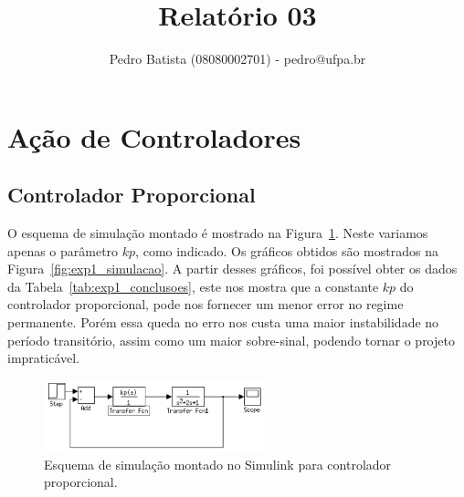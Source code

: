 \documentclass[a4paper]{article}
\title{Relatório 03}
\author{Pedro Batista (08080002701) - pedro@ufpa.br}
\begin{document}
\maketitle

\section{Ação de Controladores}

\subsection{Controlador Proporcional}
O esquema de simulação montado é mostrado na Figura~\ref{fig:exp1}. Neste variamos
apenas o parâmetro $kp$, como indicado. Os gráficos obtidos são mostrados na
Figura~\ref{fig:exp1_simulacao}. A partir desses gráficos, foi possível obter os
dados da Tabela~\ref{tab:exp1_conclusoes}, este nos mostra que a constante $kp$
do controlador proporcional, pode nos fornecer um menor error no regime permanente.
Porém essa queda no erro nos custa uma maior instabilidade no período transitório,
assim como um maior sobre-sinal, podendo tornar o projeto impraticável.

\begin{figure}[h]
   \centering
   \includegraphics[width=2.5in]{exp1}
   \caption{Esquema de simulação montado no Simulink para controlador proporcional.}
   \label{fig:exp1}
\end{figure}
\end{document}
